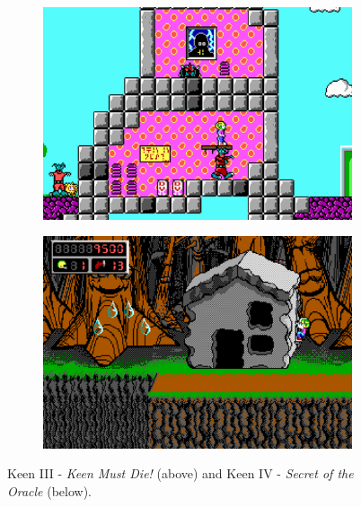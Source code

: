 \documentclass[book.tex]{subfiles}
\begin{document}
\begin{figure}[H]
\centering
\begin{subfigure}[b]{\textwidth}
  \includegraphics[width=.95\textwidth]{screenshots_300dpi/keen1_3.png}
\end{subfigure}
\par\bigskip %
\begin{subfigure}[b]{\textwidth}
  \includegraphics[width=.95\textwidth]{screenshots_300dpi/keen2_1.png}
\end{subfigure}
\caption*{Keen III - \textit{Keen Must Die!} (above) and Keen IV - \textit{Secret of the Oracle} (below).}
\end{figure}  
\end{document}
